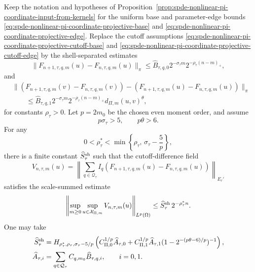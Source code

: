\begin{corollary}
\label{cor:spde-nonlinear-pi-shell-separated-cutoff-input}
Keep the notation and hypotheses of
Proposition~\ref{prop:spde-nonlinear-pi-coordinate-input-from-kernels} for
the uniform base and parameter-edge bounds
\eqref{eq:spde-nonlinear-pi-coordinate-projective-base} and
\eqref{eq:spde-nonlinear-pi-coordinate-projective-edge}.  Replace the
cutoff assumptions
\eqref{eq:spde-nonlinear-pi-coordinate-projective-cutoff-base} and
\eqref{eq:spde-nonlinear-pi-coordinate-projective-cutoff-edge} by the
shell-separated estimates
\begin{equation}
  \|F_{n+1,\tau,q,m}(u)-F_{n,\tau,q,m}(u)\|_\pi
  \leq
  \widehat B_{\tau,q,0}
  2^{-\sigma_\tau m}2^{-\rho_\tau(n-m)_+},
  \label{eq:spde-nonlinear-pi-shell-projective-cutoff-base}
\end{equation}
and
\begin{equation}
\begin{aligned}
  &\|
    (F_{n+1,\tau,q,m}(v)-F_{n,\tau,q,m}(v))
    -(F_{n+1,\tau,q,m}(u)-F_{n,\tau,q,m}(u))
  \|_\pi                                             \\
  &\qquad\leq
  \widehat B_{\tau,q,1}
  2^{-\sigma_\tau m}2^{-\rho_\tau(n-m)_+}
  d_{\Pi,m}(u,v)^\theta ,
\end{aligned}
  \label{eq:spde-nonlinear-pi-shell-projective-cutoff-edge}
\end{equation}
for constants \(\rho_\tau>0\).  Let \(p=2m_0\) be the chosen even moment
order, and assume
\[
  p\sigma_\tau>5,\qquad p\theta>6 .
\]
For any
\begin{equation}
  0<\rho_\tau^*
  <
  \min\left\{
    \rho_\tau,\,
    \sigma_\tau-\frac5p
  \right\},
  \label{eq:spde-nonlinear-pi-shell-retained-rate}
\end{equation}
there is a finite constant \(\widehat S_\tau^{\rm sh}\) such that the
cutoff-difference field
\[
  V_{n,\tau,m}(u)
  =
  \left\|
    \sum_{q\in\mathcal Q_\tau}
    I_q(F_{n+1,\tau,q,m}(u)-F_{n,\tau,q,m}(u))
  \right\|_{E_r'}
\]
satisfies the scale-summed estimate
\begin{equation}
  \left\|
    \sup_{m\geq0}\sup_{u\in\mathcal X_{\Pi,m}} V_{n,\tau,m}(u)
  \right\|_{L^p(\Omega)}
  \leq
  \widehat S_\tau^{\rm sh}\,2^{-\rho_\tau^*n}.
  \label{eq:spde-nonlinear-pi-shell-scale-summed-cutoff}
\end{equation}
One may take
\begin{equation}
\begin{aligned}
  \widehat S_\tau^{\rm sh}
  &=
  H_{\rho_\tau^*,\rho_\tau,\sigma_\tau-5/p}
  \left(
    C_{\Pi,0}^{1/p}\widehat A_{\tau,0}
    +
    C_{\Pi,1}^{1/p}\widehat A_{\tau,1}
    (1-2^{-(p\theta-6)/p})^{-1}
  \right),\\
  \widehat A_{\tau,i}
  &=
  \sum_{q\in\mathcal Q_\tau}
  C_{q,m_0}\widehat B_{\tau,q,i},
  \qquad i=0,1 .
\end{aligned}
  \label{eq:spde-nonlinear-pi-shell-scale-summed-constant}
\end{equation}
\end{corollary}

